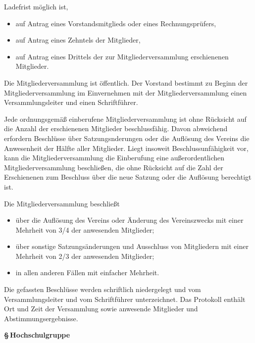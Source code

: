 \documentclass[11pt]{article}
\def\items#1{{%
  \itcounter0%
  \begin{itemize}
  #1
  \end{itemize}
}}
\let\it\item%
\def\item{
  \advance\itcounter1%
  \it[(\the\itcounter)]
}
\def\paragraf#1{
  \advance\itcounter1%
  \par\medskip
  {\large\bfseries \S\,\the\itcounter\quad#1}
  \par\smallskip
}
\begin{document}
{       Ladefrist m{\"o}glich ist,
      \items{
        \item auf Antrag eines Vorstandsmitglieds oder eines Rechnungspr{\"u}fers,
        \item auf Antrag eines Zehntels der Mitglieder,
        \item auf Antrag eines Drittels der zur Mitgliederversammlung erschienenen Mitglieder.
       }
   \item
       Die Mitgliederversammlung ist {\"o}ffentlich. Der Vorstand bestimmt zu Beginn der Mitglieder\-ver\-samm\-lung
       im Einvernehmen mit der Mitgliederversammlung einen Versammlungsleiter und einen Schrift\-f{\"u}hrer.
   \item 
         Jede ordnungsgem{\"a}{\ss} einberufene Mitgliederversammlung ist ohne R{\"u}cksicht auf
         die Anzahl der erschienenen Mitglieder beschlussf{\"a}hig.
         Davon abweichend erfordern Beschl{\"u}sse {\"u}ber Satzungsnderungen oder
         die Aufl{\"o}sung des Vereins die
         Anwesenheit der H{\"a}lfte aller Mitglieder. Liegt insoweit Beschlussunf{\"a}higkeit
         vor, kann die Mitgliederversammlung die Einberufung eine au{\ss}erordentlichen
         Mitgliederversammlung beschlie{\ss}en, die ohne R{\"u}cksicht auf die Zahl der Erschienenen zum
         Beschluss {\"u}ber die neue Satzung oder die Aufl{\"o}sung berechtigt ist.
   \item
     Die Mitgliederversammlung beschlie{\ss}t
     \items{
       \item {\"u}ber die Aufl{\"o}sung des Vereins oder {\"A}nderung des Vereinszwecks mit  einer
              Mehrheit von 3/4 der anwesenden Mitglieder;
       \item {\"u}ber sonstige Satzungs{\"a}nderungen und Ausschluss von Mitgliedern mit einer Mehrheit von
                2/3 der anwesenden Mitglieder;
       \item in allen anderen F{\"a}llen mit einfacher Mehrheit.
     }
   \item Die gefassten Beschl{\"u}sse werden schriftlich niedergelegt und vom
        Versammlungsleiter und vom Schriftf{\"u}hrer unterzeichnet. Das Protokoll enth{\"a}lt
        Ort und Zeit der Versammlung sowie anwesende Mitglieder und Abstimmungsergebnisse.
}


\paragraf{Hochschulgruppe}
\end{document}
